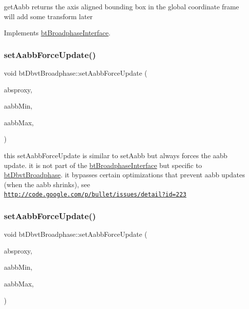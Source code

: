 get\+Aabb returns the axis aligned bounding box in the \textquotesingle{}global\textquotesingle{} coordinate frame will add some transform later 

Implements \hyperlink{classbtBroadphaseInterface_ab5af9e26414f5a72a76040b8fab4d9e2}{bt\+Broadphase\+Interface}.

\mbox{\label{structbtDbvtBroadphase_a645dd617d0bbe7767859f424e2ee18c1}} 
\subsubsection{\texorpdfstring{set\+Aabb\+Force\+Update()}{setAabbForceUpdate()}\hspace{0.1cm}{\footnotesize\ttfamily [1/2]}}
{\footnotesize\ttfamily void bt\+Dbvt\+Broadphase\+::set\+Aabb\+Force\+Update (\begin{DoxyParamCaption}\item[{bt\+Broadphase\+Proxy $\ast$}]{absproxy,  }\item[{const bt\+Vector3 \&}]{aabb\+Min,  }\item[{const bt\+Vector3 \&}]{aabb\+Max,  }\item[{\hyperlink{classbtDispatcher}{bt\+Dispatcher} $\ast$}]{ }\end{DoxyParamCaption})}

this set\+Aabb\+Force\+Update is similar to set\+Aabb but always forces the aabb update. it is not part of the \hyperlink{classbtBroadphaseInterface}{bt\+Broadphase\+Interface} but specific to \hyperlink{structbtDbvtBroadphase}{bt\+Dbvt\+Broadphase}. it bypasses certain optimizations that prevent aabb updates (when the aabb shrinks), see \href{http://code.google.com/p/bullet/issues/detail?id=223}{\tt http\+://code.\+google.\+com/p/bullet/issues/detail?id=223} \mbox{\label{structbtDbvtBroadphase_a645dd617d0bbe7767859f424e2ee18c1}} 
\subsubsection{\texorpdfstring{set\+Aabb\+Force\+Update()}{setAabbForceUpdate()}\hspace{0.1cm}{\footnotesize\ttfamily [2/2]}}
{\footnotesize\ttfamily void bt\+Dbvt\+Broadphase\+::set\+Aabb\+Force\+Update (\begin{DoxyParamCaption}\item[{bt\+Broadphase\+Proxy $\ast$}]{absproxy,  }\item[{const bt\+Vector3 \&}]{aabb\+Min,  }\item[{const bt\+Vector3 \&}]{aabb\+Max,  }\item[{\hyperlink{classbtDispatcher}{bt\+Dispatcher} $\ast$}]{ }\end{DoxyParamCaption})}

